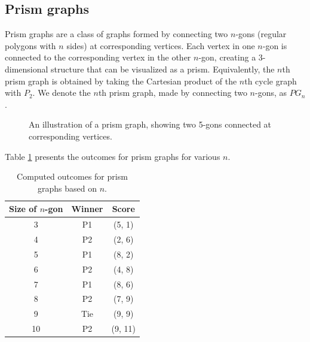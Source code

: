 \documentclass{article}
\begin{document}
\subsection{Prism graphs}

Prism graphs are a class of graphs formed by connecting two $n$-gons (regular polygons with $n$ sides) at corresponding vertices. Each vertex in one $n$-gon is connected to the corresponding vertex in the other $n$-gon, creating a 3-dimensional structure that can be visualized as a prism. Equivalently, the $n$th prism graph is obtained by taking the Cartesian product of the $n$th cycle graph with $P_2$. We denote the $n$th prism graph, made by connecting two $n$-gons, as $PG_n$.

\begin{figure}[hbt!]
\centering
{}
\caption{An illustration of a prism graph, showing two 5-gons connected at corresponding vertices.}
\label{fig:double-ngon}
\end{figure}
\FloatBarrier 

Table \ref{table:double-ngon-outcomes} presents the outcomes for prism graphs for various $n$.

\begin{table}[hbt!]
\centering
\begin{tabular}{|c|c|c|}
\hline
\textbf{Size of $n$-gon} & \textbf{Winner} & \textbf{Score} \\
\hline
3 & P1 & (5, 1) \\
4 & P2 & (2, 6) \\
5 & P1 & (8, 2) \\
6 & P2 & (4, 8) \\
7 & P1 & (8, 6) \\
8 & P2 & (7, 9) \\
9 & Tie & (9, 9) \\
10 & P2 & (9, 11) \\
\hline
\end{tabular}
\caption{Computed outcomes for prism graphs based on $n$.}
\label{table:double-ngon-outcomes}
\end{table}
\FloatBarrier 
\end{document}

